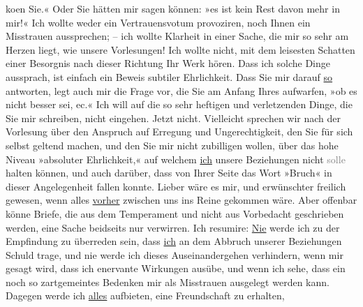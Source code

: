 \begin{ledgroupsized}[t]{13cm}
                  ko{\geminationm}en {\pb}Sie.« Oder Sie hätten mir sagen
               können: »es ist kein Rest davon mehr in mir!« Ich wollte weder ein Vertrauensvotum
               provoziren, noch Ihnen ein Misstrauen aussprechen; – ich wollte Klarheit in einer
               Sache, die mir so sehr am Herzen liegt, wie unsere Vorlesungen! Ich wollte nicht, mit
               dem leisesten Schatten einer Besorgnis nach dieser Richtung Ihr Werk hören. Dass ich solche Dinge
               aussprach, ist einfach ein Beweis subtiler Ehrlichkeit. Dass Sie mir darauf \uline{so} antworten, legt auch mir die Frage vor, die Sie am
               Anfang Ihres \label{K_L03355-4v}\label{K_L03355-4h} aufwarfen, »ob es nicht besser sei, ec.«\pend
           \pstart
           Ich will auf die so sehr heftigen und verletzenden Dinge, die Sie mir schreiben,
               nicht eingehen. Jetzt nicht. Vielleicht sprechen wir nach der Vorlesung über den
               Anspruch auf Erregung und Ungerechtigkeit, den Sie für sich selbst geltend machen,
               und den Sie mir nicht zubilligen wollen, über das hohe Niveau »absoluter
               Ehrlichkeit,« auf welchem \uline{ich} unsere Beziehungen
               nicht \textcolor{gray}{solle} halten können, und auch darüber, dass von Ihrer Seite
               das Wort »Bruch« in dieser Angelegenheit fallen konnte. Lieber wäre es mir, und
               erwünschter freilich gewesen, wenn alles \uline{vorher}
               zwischen uns ins Reine gekommen wäre. Aber offenbar könne
               Briefe, die aus dem Temperament und nicht aus Vorbedacht geschrieben werden, eine
               Sache beidseits nur verwirren. Ich resumire: \uline{Nie} werde ich {\pb}zu der Empfindung zu überreden
               sein, dass \uline{ich} an dem Abbruch unserer Beziehungen
               Schuld trage, und nie werde ich dieses Auseinandergehen verhindern, wenn mir gesagt
               wird, dass ich enervante Wirkungen ausübe, und wenn ich sehe, dass ein noch so
               zartgemeintes Bedenken mir als Misstrauen ausgelegt werden kann. Dagegen werde ich
                  \uline{alles} aufbieten, eine Freundschaft zu erhalten,

\end{ledgroupsized}
